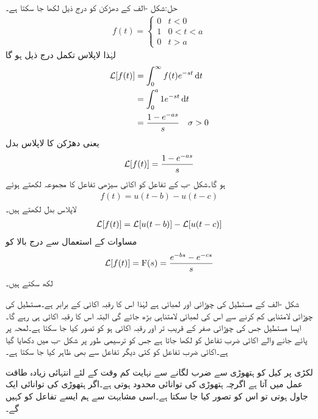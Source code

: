 حل:شکل -الف کے دھڑکن کو درج ذیل لکھا جا سکتا ہے۔
\begin{align}
f(t)=
\begin{cases}
0& t<0\\
1& 0<t<a\\
0& t>a
\end{cases}
\end{align}
لہٰذا لاپلاس تکمل درج ذیل ہو گا
\begin{align*}
\Laplace[f(t)]&=\int_0^{\infty} f(t) e^{-st} \dif t\\
&=\int_0^a 1e^{-st} \dif t\\
&=\frac{1-e^{-as}}{s} \quad \sigma >0
\end{align*}
یعنی دھڑکن کا لاپلاس بدل
\begin{align}
\mathcal{L}[f(t)]=\frac{1-e^{-as}}{s}
\end{align}
ہو گا۔شکل -ب کے تفاعل کو اکائی سیڑھی تفاعل کا مجموعہ لکھتے ہوئے
\begin{align*}
f(t)=u(t-b)-u(t-c)
\end{align*} 
لاپلاس بدل لکھتے ہیں۔
\begin{align*}
\mathcal{L}[f(t)]=\mathcal{L}[u(t-b)]-\mathcal{L}[u(t-c)]
\end{align*}
مساوات  کے استعمال سے درج بالا کو 
\begin{align}
\mathcal{L}[f(t)]={{\textup{F}}}(s)=\frac{e^{-bs}-e^{-cs}}{s}
\end{align}
لکھ سکتے ہیں۔

شکل -الف کے مستطیل کی چوڑائی  اور لمبائی  ہے لہٰذا اس کا رقبہ 
 اکائی کے برابر ہے۔مستطیل کی چوڑائی لامتناہی کم  کرنے سے اس کی لمبائی لامتناہی بڑھ  جائے گی البتہ اس کا رقبہ اکائی ہی رہے گا۔ایسا مستطیل جس کی چوڑائی صفر کے قریب تر اور رقبہ اکائی ہو کو  تصور کیا جا سکتا ہے۔لمحہ  پر پائے جانے والے اکائی ضرب تفاعل کو  لکھا جاتا ہے جس کو ترسیمی طور پر شکل -ب میں دکھایا گیا ہے۔اکائی ضرب تفاعل کو کئی دیگر تفاعل سے بھی ظاہر کیا جا سکتا ہے۔

لکڑی پر کیل کو ہتھوڑی سے ضرب لگانے سے نہایت کم وقت کے لئے انتہائی زیادہ طاقت عمل میں آتا ہے اگرچہ ہتھوڑی کی توانائی محدود ہوتی ہے۔اگر ہتھوڑی کی توانائی ایک جاول ہوتی تو اس کو  تصور کیا جا سکتا ہے۔اسی مشابہت سے ہم ایسے تفاعل کو  کہیں گے۔

